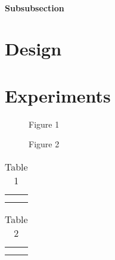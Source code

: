 \subsubsection{Subsubsection}
\chapter{Design}
\chapter{Experiments}
\begin{figure}
    \centering
    \caption{Figure 1}
    \label{fig:enter-label}
\end{figure}

\begin{figure}
    \centering
    \caption{Figure 2}
    \label{fig:enter-label2}
\end{figure}

\begin{table}[]
    \centering
    \begin{tabular}{c|c}
         &  \\
         & 
    \end{tabular}
    \caption{Table 1}
    \label{tab:my_label}
\end{table}

\begin{table}[]
    \centering
    \begin{tabular}{c|c}
         &  \\
         & 
    \end{tabular}
    \caption{Table 2}
    \label{tab:my_label2}
\end{table}